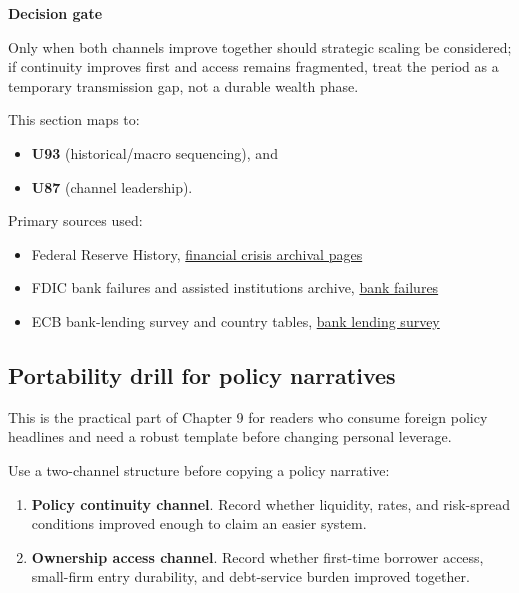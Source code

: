 \documentclass[11pt,openany]{book}
\begin{document}
\begin{notebox}
\textbf{Decision gate}\par
Only when both channels improve together should strategic scaling be considered; if continuity improves first and access remains fragmented, treat the period as a temporary transmission gap, not a durable wealth phase.
\end{notebox}

This section maps to:
\begin{itemize}
  \item \textbf{U93} (historical/macro sequencing), and
  \item \textbf{U87} (channel leadership).
\end{itemize}

Primary sources used:
\begin{itemize}
  \item Federal Reserve History, \href{https://www.federalreservehistory.org/time-period/financial-crisis}{financial crisis archival pages}
  \item FDIC bank failures and assisted institutions archive, \href{https://www.fdic.gov/resources/resolutions/bank-failures/}{bank failures}
  \item ECB bank-lending survey and country tables, \href{https://www.ecb.europa.eu/stats/ecb_surveys/bank_lending_survey/html/index.en.html}{bank lending survey}
\end{itemize}

\subsection{Portability drill for policy narratives}
\label{subsec:policy-narrative-portability}

This is the practical part of Chapter 9 for readers who consume foreign policy headlines and need a robust template before changing personal leverage.

Use a two-channel structure before copying a policy narrative:

\begin{enumerate}
  \item \textbf{Policy continuity channel}. Record whether liquidity, rates, and risk-spread conditions improved enough to claim an easier system.
  \item \textbf{Ownership access channel}. Record whether first-time borrower access, small-firm entry durability, and debt-service burden improved together.
\end{enumerate}
\end{document}
